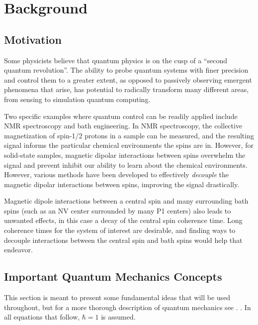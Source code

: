\chapter{Background}

%


\section{Motivation}

Some physicists believe that quantum physics is on the cusp of a ``second quantum revolution''.\cite{quantum-rev} The ability to probe quantum systems with finer precision and control them to a greater extent, as opposed to passively observing emergent phenomena that arise, has potential to radically transform many different areas, from sensing to simulation quantum computing.

Two specific examples where quantum control can be readily applied include NMR spectroscopy and bath engineering. In NMR spectroscopy, the collective magnetization of spin-1/2 protons in a sample can be measured, and the resulting signal informs the particular chemical environments the spins are in. However, for solid-state samples, magnetic dipolar interactions between spins overwhelm the signal and prevent inhibit our ability to learn about the chemical environments. However, various methods have been developed to effectively \emph{decouple} the magnetic dipolar interactions between spins, improving the signal drastically.

Magnetic dipole interactions between a central spin and many surrounding bath spins (such as an NV center surrounded by many P1 centers) also leads to unwanted effects, in this case a decay of the central spin coherence time. Long coherence times for the system of interest are desirable, and finding ways to decouple interactions between the central spin and bath spins would help that endeavor.

\section{Important Quantum Mechanics Concepts}

This section is meant to present some fundamental ideas that will be used throughout, but for a more thorough description of quantum mechanics see
\cite{mcintyre2012quantum, sakurai2017modern}.
.
In all equations that follow, $\hbar = 1$ is assumed.


